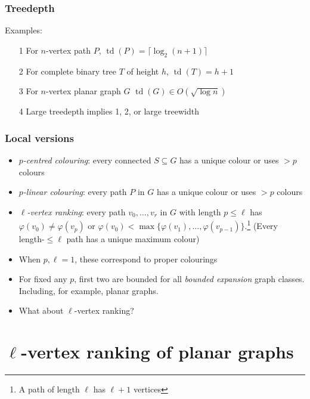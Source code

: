 \documentclass[xcolor=dvipsnames]{beamer}
\DeclareMathOperator{\td}{td}
\begin{document}
\begin{frame}
  \frametitle{Treedepth}

  Examples:
  \begin{enumerate}[<+->]
    \item[1] For $n$-vertex path $P$, $\td(P)=\lceil \log_2 (n+1)\rceil$
    \item[2] For complete binary tree $T$ of height $h$, $\td(T)=h+1$
    \item[3] For $n$-vertex planar graph $G$ $\td(G)\in O(\sqrt{\log n})$
    \item[4] Large treedepth implies 1, 2, or large treewidth
  \end{enumerate}
\end{frame}


\begin{frame}
  \frametitle{Local versions}

  \begin{itemize}
    \item \emph{$p$-centred colouring}: every connected $S\subseteq G$ has a unique colour or uses $>\!\!p$ colours

    \item \emph{$p$-linear colouring}: every path $P$ in $G$ has a unique colour or uses $>\!\!p$ colours

    \item \emph{$\ell$-vertex ranking}: every path $v_0,\ldots,v_r$ in $G$ with length $p\le\ell$ has $\varphi(v_0)\neq\varphi(v_p)$ or $\varphi(v_0)<\max\{\varphi(v_1),\ldots,\varphi(v_{p-1})\}$.\footnote{A path of length $\ell$ has $\ell+1$ vertices}\newline
    (Every length-$\le\!\!\ell$ path has a unique maximum colour)

    \item<2-> When $p,\ell=1$, these correspond to proper colourings

    \item<3-> For fixed any $p$, first two are bounded for all \emph{bounded expansion} graph classes. Including, for example, planar graphs.

    \item<4-> What about $\ell$-vertex ranking?
  \end{itemize}
\end{frame}


\section{$\ell$-vertex ranking of planar graphs}
\end{document}
